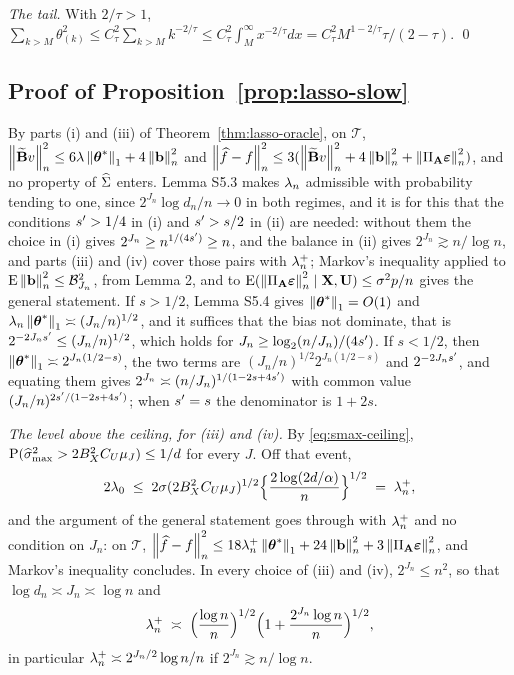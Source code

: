 \emph{The tail.} With $2/\tau>1$,
$\sum_{k>M}\theta^2_{(k)} \le C_\tau^2\sum_{k>M}k^{-2/\tau} \le
C_\tau^2\int_M^{\infty}x^{-2/\tau}dx = C_\tau^2M^{1-2/\tau}\tau/(2-\tau)$.
\qed

\subsection*{Proof of Proposition~\ref{prop:lasso-slow}}

By parts (i) and (iii) of Theorem~\ref{thm:lasso-oracle}, on $\mathcal{T}$,
$\left\lVert \widetilde{\mathbf{B}} v \right\rVert_{n}^2 \le 6\lambda\left\lVert \boldsymbol{\theta}^{*} \right\rVert_1+4\left\lVert \mathbf{b} \right\rVert_{n}^2$ and
$\left\lVert \widehat{f}-f \right\rVert_{n}^2 \le 3(\left\lVert \widetilde{\mathbf{B}} v \right\rVert_{n}^2+4\left\lVert \mathbf{b} \right\rVert_{n}^2+
\left\lVert \Pi_{\mathbf{A}}\boldsymbol{\varepsilon} \right\rVert_{n}^2)$, and no property of $\widehat{\Sigma}$ enters. Lemma S5.3 makes
$\lambda_{n}$ admissible with probability tending to one, since
$2^{J_n}\log d_n/n \to 0$ in both regimes, and it is for this that the conditions
$s' > 1/4$ in (i) and $s' > s/2$ in (ii) are needed: without them the choice
in (i) gives $2^{J_n} \ge n^{1/(4s')} \ge n$, and the balance in (ii) gives
$2^{J_n} \gtrsim n/\log n$, and parts (iii) and (iv) cover those pairs with
$\lambda_{n}^{+}$; Markov's inequality
applied to $\mathrm{E}\left\lVert \mathbf{b} \right\rVert_{n}^2 \le \mathcal{B}^2_{J_n}$, from Lemma 2, and to
$\mathrm{E}(\left\lVert \Pi_{\mathbf{A}}\boldsymbol{\varepsilon} \right\rVert_{n}^2\mid\mathbf{X},\mathbf{U}) \le \sigma^2p/n$ gives the general
statement. If $s>1/2$, Lemma S5.4 gives $\left\lVert \boldsymbol{\theta}^{*} \right\rVert_1 = O(1)$ and
$\lambda_{n}\left\lVert \boldsymbol{\theta}^{*} \right\rVert_1 \asymp (J_n/n)^{1/2}$, and it suffices that the bias
not dominate, that is $2^{-2J_ns'} \le (J_n/n)^{1/2}$, which holds for
$J_n \ge \log_2(n/J_n)/(4s')$. If $s<1/2$, then
$\left\lVert \boldsymbol{\theta}^{*} \right\rVert_1 \asymp 2^{J_n(1/2-s)}$, the two terms are
$(J_n/n)^{1/2}2^{J_n(1/2-s)}$ and $2^{-2J_ns'}$, and equating them gives
$2^{J_n} \asymp (n/J_n)^{1/(1-2s+4s')}$ with common value
$(J_n/n)^{2s'/(1-2s+4s')}$; when $s' = s$ the denominator is
$1+2s$.

\emph{The level above the ceiling, for (iii) and (iv).} By
\eqref{eq:smax-ceiling}, $\mathrm{P}(\widehat{\sigma}_{\max}^{2} > 2B_X^{2}C_U\mu_{J}) \le 1/d$ for
every $J$. Off that event,
\[
  2\lambda_0 \;\le\; 2\sigma(2B_X^{2}C_U\mu_{J})^{1/2}
  \Bigl\{\frac{2\log(2d/\alpha)}{n}\Bigr\}^{1/2} \;=\; \lambda_{n}^{+},
\]
and the argument of the general statement goes through with
$\lambda_{n}^{+}$ and no condition on $J_n$: on $\mathcal{T}$,
$\left\lVert \widehat{f}-f \right\rVert_{n}^{2} \le 18\lambda_{n}^{+}\left\lVert \boldsymbol{\theta}^{*} \right\rVert_{1} +
24\left\lVert \mathbf{b} \right\rVert_{n}^{2} + 3\left\lVert \Pi_{\mathbf{A}}\boldsymbol{\varepsilon} \right\rVert_{n}^{2}$, and Markov's inequality
concludes. In every choice of (iii) and (iv), $2^{J_n} \le n^{2}$, so that
$\log d_n \asymp J_n \asymp \log n$ and
\begin{equation}
  \label{eq:lam-plus}
  \lambda_{n}^{+} \;\asymp\; \Bigl(\frac{\log n}{n}\Bigr)^{1/2}
  \Bigl(1 + \frac{2^{J_n}\log n}{n}\Bigr)^{1/2},
\end{equation}
in particular $\lambda_{n}^{+} \asymp 2^{J_n/2}\log n/n$ if
$2^{J_n} \gtrsim n/\log n$.

